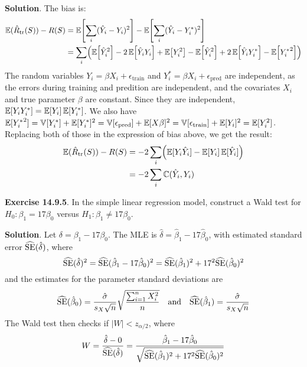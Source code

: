 \textbf{Solution}.
The bias is:
\begin{align*}
\EXP(\hat{R}_\text{tr}(S)) - R(S) &= \EXP\left[\sum_{i} (\hat{Y}_{i}- Y_{i})^{2} \right] - \EXP \left[ \sum_{i} (\hat{Y}_{i} - Y_{i}^{*})^{2} \right] \\
&= \sum_{i} \left( \EXP \left[\hat{Y}_{i}^{2} \right] - 2 \EXP \left[\hat{Y}_{i} Y_{i} \right] + \EXP\left[Y_{i}^{2} \right] - \EXP \left[\hat{Y}_{i}^{2} \right] + 2 \EXP \left[\hat{Y}_{i} Y_{i}^{*} \right] - \EXP\left[{Y_{i}^{*}}^{2} \right] \right)
\end{align*}
The random variables \(Y_{i} = \beta X_{i} + \epsilon_\text{train}\) and
\(Y_{i}^{*} = \beta X_{i} + \epsilon_\text{pred}\) are independent, as the
errors during training and predition are independent, and the covariates
\(X_{i}\) and true parameter \(\beta\) are constant. Since they are
independent,
\(\operatorname{\mathbb{E}}[Y_{i} Y_{i}^{*}] = \operatorname{\mathbb{E}}[Y_{i}] \operatorname{\mathbb{E}}[Y_{i}^{*}]\).
We also have
\(\operatorname{\mathbb{E}} [ {Y_{i}^{*}}^{2} ] = \operatorname{\mathbb{V}}[Y_{i}^{*}] + \operatorname{\mathbb{E}}[Y_{i}^{*}]^{2} = \operatorname{\mathbb{V}}[\epsilon_\text{pred}] + \operatorname{\mathbb{E}}[X \beta]^{2} = \operatorname{\mathbb{V}}[\epsilon_\text{train}] + \operatorname{\mathbb{E}}[Y_{i}]^{2} = \operatorname{\mathbb{E}} [Y_{i}^{2}]\).
Replacing both of those in the expression of bias above, we get the
result:
\begin{align*}
\EXP(\hat{R}_\text{tr}(S)) - R(S) &= 
-2 \sum_{i} \left( \EXP[Y_{i} \hat{Y}_{i}] - \EXP[Y_{i}] \EXP[\hat{Y}_{i}] \right) \\
&= -2 \sum_{i} \COV(\hat{Y}_{i}, Y_{i})
\end{align*}

\textbf{Exercise 14.9.5}. In the simple linear regression model,
construct a Wald test for \(H_{0} : \beta_{1} = 17 \beta_{0}\) versus
\(H_{1} : \beta_{1} \neq 17 \beta_{0}\).

\textbf{Solution}. Let \(\delta = \beta_{1} - 17 \beta_{0}\). The MLE is
\(\hat{\delta} = \hat{\beta}_{1} - 17 \hat{\beta}_{0}\), with estimated
standard error \(\widehat{\operatorname{\mathrm{SE}}}(\hat{\delta})\), where
\[
\widehat{\operatorname{\mathrm{SE}}}(\hat{\delta})^{2} = \widehat{\operatorname{\mathrm{SE}}}(\hat{\beta}_{1} - 17 \hat{\beta}_{0})^{2} = \widehat{\operatorname{\mathrm{SE}}}(\hat{\beta}_{1})^{2} + 17^{2} \widehat{\operatorname{\mathrm{SE}}}(\hat{\beta}_{0})^{2}
\]
and the estimates for the parameter standard deviations are
\[
\widehat{\operatorname{\mathrm{SE}}}(\hat{\beta}_{0}) = \frac{\hat{\sigma}}{s_X \sqrt{n}} \sqrt{\frac{\sum_{i=1}^{n} X_{i}^{2}}{n}}
\quad \text{and} \quad
\widehat{\operatorname{\mathrm{SE}}}(\hat{\beta}_{1}) = \frac{\hat{\sigma}}{s_X \sqrt{n}}
\]
The Wald test then checks if \(|W| < z_{\alpha / 2}\), where
\[
W = \frac{\hat{\delta} - 0}{\widehat{\operatorname{\mathrm{SE}}}(\hat{\delta})} 
= \frac{\hat{\beta}_{1} - 17 \hat{\beta}_{0}}{\sqrt{\widehat{\operatorname{\mathrm{SE}}}(\hat{\beta}_{1})^{2} + 17^{2} \widehat{\operatorname{\mathrm{SE}}}(\hat{\beta}_{0})^{2}}}
\]

